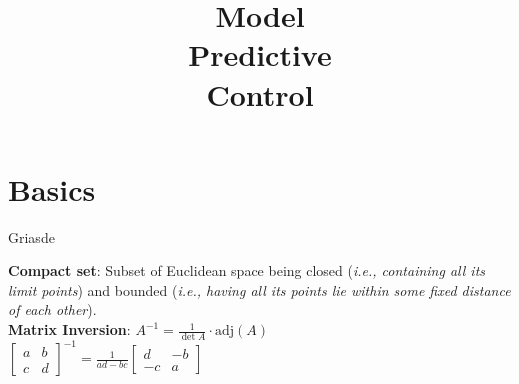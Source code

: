 \documentclass[english]{latex4ei/latex4ei_sheet}
\title{Model\\Predictive\\Control}
\begin{document}
\maketitle	%

\section{Basics}
\begin{sectionbox}
\begin{emphbox}
    Griasde
\end{emphbox}
\textbf{Compact set}: Subset of Euclidean space being closed (\textit{i.e., containing all its limit points}) and bounded (\textit{i.e., having all its points lie within some fixed distance of each other}).\\
\textbf{Matrix Inversion}: $A^{-1}=\frac{1}{\det{A}}\cdot\textrm{adj}(A)$
\\ $\begin{bmatrix}a & b \\ c & d\end{bmatrix}^{-1} = \frac{1}{ad-bc} \begin{bmatrix}d & -b \\ -c & a\end{bmatrix}$

\end{sectionbox}
\end{document}
